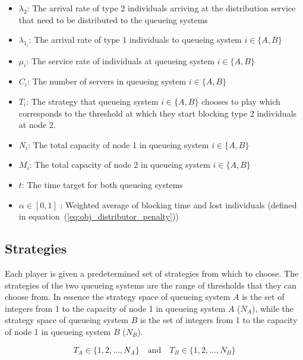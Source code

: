\begin{itemize}
    \item \(\lambda_2\): The arrival rate of type 2 individuals arriving at the
    distribution service that need to be distributed to the queueing systems
    \item \(\lambda_{1_i}\): The arrival rate of type 1 individuals to queueing
    system \(i\in\{A, B\}\)
    \item \(\mu_i\): The service rate of individuals at queueing system
    \(i\in\{A, B\}\)
    \item \(C_i\): The number of servers in queueing system \(i\in\{A, B\}\)
    \item \(T_i\): The strategy that queueing system \(i\in\{A, B\} \) chooses
    to play which corresponds to the threshold at which they start blocking
    type 2 individuals at node 2.
    \item \(N_i\): The total capacity of node 1 in queueing system
    \(i\in\{A, B\}\)
    \item \(M_i\): The total capacity of node 2 in queueing system
    \(i\in\{A, B\}\)
    \item \(t\): The time target for both queueing systems
    \item \(\alpha \in [0, 1]\) : Weighted average of blocking time and
    lost individuals (defined in equation~(\ref{eq:obj_distributor_penalty}))
\end{itemize}

\subsection{Strategies}\label{sec:game_strategies}

Each player is given a predetermined set of strategies from which to choose.
The strategies of the two queueing systems are the range of thresholds that they
can choose from.
In essence the strategy space of queueing system \(A\) is the set of integers
from
1 to the capacity of node 1 in queueing system \(A\) (\(N_A\)), while the
strategy space of queueing system \(B\) is the set of integers from 1 to the
capacity of node 1 in queueing system \(B\) (\(N_B\)).

\begin{equation}\label{eq:game_strategy_space_queueing_systems}
    T_A \in \{1, 2, \ldots, N_A\} \quad \text{and} \quad
    T_B \in \{1, 2, \ldots, N_B\}
\end{equation}

